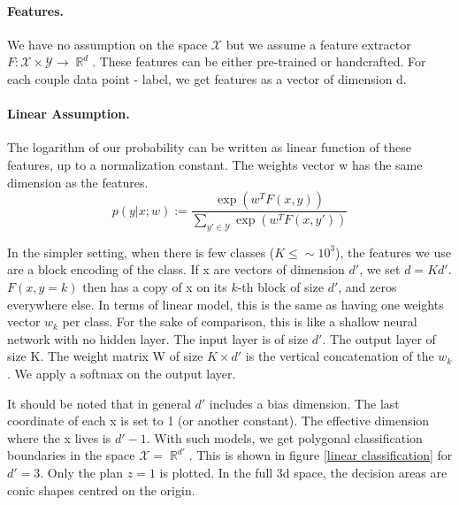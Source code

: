 \documentclass{article}
\DeclareMathOperator{\R}{\mathbb{R}}
\DeclareMathOperator{\1}{\mathbb{1}}
\begin{document}
\paragraph{Features.}
We have no assumption on the space $\mathcal{X}$ but we assume a feature extractor $F:\mathcal{X}\times \mathcal{Y} \rightarrow \R^d$.
These features can be either pre-trained or handcrafted.
For each couple data point - label, we get features as a vector of dimension d.

\paragraph{Linear Assumption.}
The logarithm of our probability can be written as linear function of these features, up to a normalization constant.
The weights vector w has the same dimension as the features.
\begin{equation}
	p(y | x ; w) := \frac{\exp(w^TF(x, y))}{\sum_{y' \in \mathcal{Y}} \exp(w^TF(x, y'))}
\end{equation}

In the simpler setting, when there is few classes ($K \leq \sim 10^3$), the features we use are a block encoding of the class.
If x are vectors of dimension $d'$, we set $d=Kd'$. $F(x, y=k)$ then has a copy of x on its $k$-th block of size $d'$, and zeros everywhere else.
In terms of linear model, this is the same as having one weights vector $w_k$ per class.
For the sake of comparison, this is like a shallow neural network with no hidden layer.
The input layer is of size $d'$.
The output layer of size K.
The weight matrix W of size $K \times d'$ is the vertical concatenation of the $w_k$.
We apply a softmax on the output layer.

It should be noted that in general $d'$ includes a bias dimension.
The last coordinate of each x is set to 1 (or another constant).
The effective dimension where the x lives is $d'-1$.
With such models, we get polygonal classification boundaries in the space $\mathcal X = \R^{d'}$.
This is shown in figure \ref{linear classification} for $d'=3$.
Only the plan $z=1$ is plotted. In the full 3d space, the decision areas are conic shapes centred on the origin.
\end{document}
